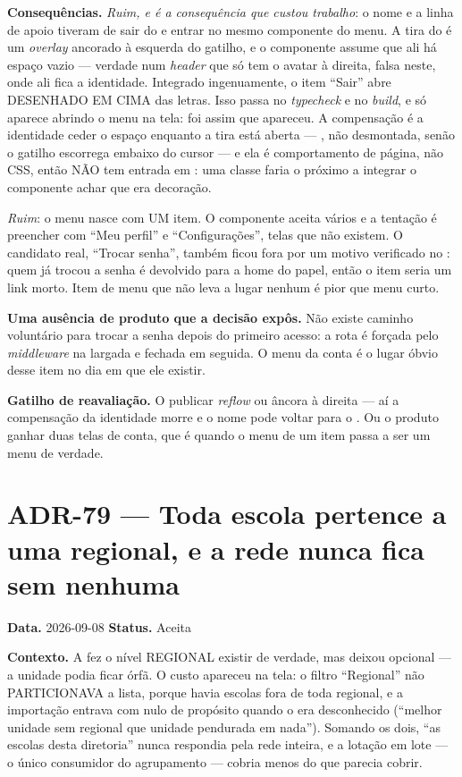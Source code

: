 \textbf{Consequências.} \emph{Ruim, e é a consequência que custou trabalho}: o
nome e a linha de apoio tiveram de sair do  e entrar no
mesmo componente do menu. A tira do  é um \emph{overlay} ancorado
à esquerda do gatilho, e o componente assume que ali há espaço vazio --- verdade
num \emph{header} que só tem o avatar à direita, falsa neste, onde ali fica a
identidade. Integrado ingenuamente, o item \enquote{Sair} abre DESENHADO EM CIMA
das letras. Isso passa no \emph{typecheck} e no \emph{build}, e só aparece
abrindo o menu na tela: foi assim que apareceu. A compensação é a identidade
ceder o espaço enquanto a tira está aberta --- , não desmontada,
senão o gatilho escorrega embaixo do cursor --- e ela é comportamento de página,
não CSS, então NÃO tem entrada em : uma classe faria o
próximo a integrar o componente achar que era decoração.

\emph{Ruim}: o menu nasce com UM item. O componente aceita vários e a tentação é
preencher com \enquote{Meu perfil} e \enquote{Configurações}, telas que não
existem. O candidato real, \enquote{Trocar senha}, também ficou fora por um
motivo verificado no : quem já trocou a senha é devolvido para
a home do papel, então o item seria um link morto. Item de menu que não leva a
lugar nenhum é pior que menu curto.

\textbf{Uma ausência de produto que a decisão expôs.} Não existe caminho
voluntário para trocar a senha depois do primeiro acesso: a rota é forçada pelo
\emph{middleware} na largada e fechada em seguida. O menu da conta é o lugar
óbvio desse item no dia em que ele existir.

\textbf{Gatilho de reavaliação.} O  publicar \emph{reflow} ou
âncora à direita --- aí a compensação da identidade morre e o nome pode voltar
para o . Ou o produto ganhar duas telas de conta, que é
quando o menu de um item passa a ser um menu de verdade.

\section{ADR-79 --- Toda escola pertence a uma regional, e a rede nunca fica sem
nenhuma}
\label{adr:vinculo-obrigatorio-regional}

\textbf{Data.} 2026-09-08 \quad \textbf{Status.} Aceita

\textbf{Contexto.} A  fez o nível REGIONAL existir de verdade, mas
deixou  opcional --- a unidade podia ficar órfã. O custo apareceu na
tela: o filtro \enquote{Regional} não PARTICIONAVA a lista, porque havia escolas
fora de toda regional, e a importação  entrava com 
nulo de propósito quando o  era desconhecido
(\enquote{melhor unidade sem regional que unidade pendurada em nada}). Somando os
dois, \enquote{as escolas desta diretoria} nunca respondia pela rede inteira, e a
lotação em lote --- o único consumidor do agrupamento --- cobria menos do que
parecia cobrir.

